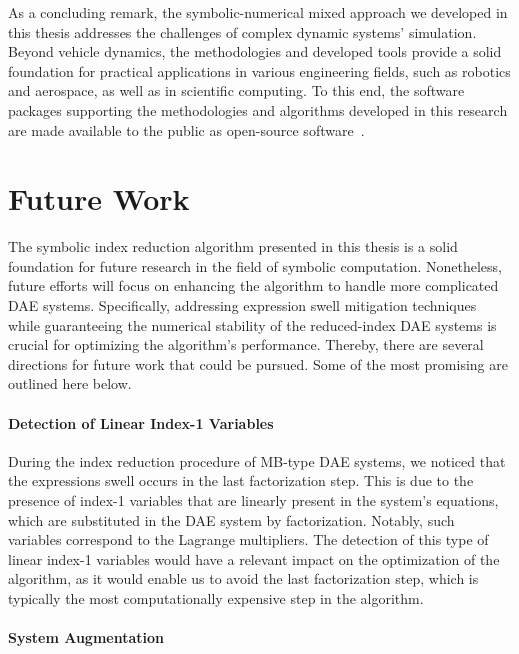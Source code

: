As a concluding remark, the symbolic-numerical mixed approach we developed in this thesis addresses the challenges of complex dynamic systems' simulation. Beyond vehicle dynamics, the methodologies and developed tools provide a solid foundation for practical applications in various engineering fields, such as robotics and aerospace, as well as in scientific computing. To this end, the software packages supporting the methodologies and algorithms developed in this research are made available to the public as open-source software~\cite{acme, enve, lime, limerickey, lem, last, indigo, trussme}.

\section{Future Work}
\label{chap6:sec:future_work}

The symbolic index reduction algorithm presented in this thesis is a solid foundation for future research in the field of symbolic computation. Nonetheless, future efforts will focus on enhancing the algorithm to handle more complicated \ac{DAE} systems. Specifically, addressing expression swell mitigation techniques while guaranteeing the numerical stability of the reduced-index \ac{DAE} systems is crucial for optimizing the algorithm's performance. Thereby, there are several directions for future work that could be pursued. Some of the most promising are outlined here below.

\paragraph{Detection of Linear Index-1 Variables}

During the index reduction procedure of \ac{MB}-type \ac{DAE} systems, we noticed that the expressions swell occurs in the last factorization step. This is due to the presence of index-1 variables that are linearly present in the system's equations, which are substituted in the \ac{DAE} system by factorization. Notably, such variables correspond to the Lagrange multipliers. The detection of this type of linear index-1 variables would have a relevant impact on the optimization of the algorithm, as it would enable us to avoid the last factorization step, which is typically the most computationally expensive step in the algorithm.

\paragraph{System Augmentation}


